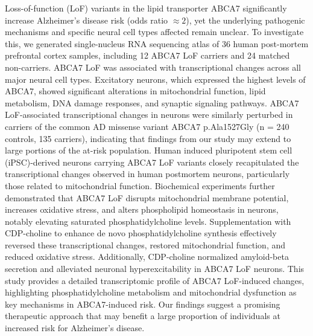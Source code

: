 Loss-of-function (LoF) variants in the lipid transporter ABCA7 significantly increase Alzheimer's disease risk (odds ratio $\approx  2$), yet the underlying pathogenic mechanisms and specific neural cell types affected remain unclear. To investigate this, we generated single-nucleus RNA sequencing atlas of 36 human post-mortem prefrontal cortex samples, including 12 ABCA7 LoF carriers and 24 matched non-carriers. ABCA7 LoF was associated with transcriptional changes across all major neural cell types. Excitatory neurons, which expressed the highest levels of ABCA7, showed significant alterations in mitochondrial function, lipid metabolism, DNA damage responses, and synaptic signaling pathways. ABCA7 LoF-associated transcriptional changes in neurons were similarly perturbed in carriers of the common AD missense variant ABCA7 p.Ala1527Gly (n = 240 controls, 135 carriers), indicating that findings from our study may extend to large portions of the at-risk population. Human induced pluripotent stem cell (iPSC)-derived neurons carrying ABCA7 LoF variants closely recapitulated the transcriptional changes observed in human postmortem neurons, particularly those related to mitochondrial function. Biochemical experiments further demonstrated that ABCA7 LoF disrupts mitochondrial membrane potential, increases oxidative stress, and alters phospholipid homeostasis in neurons, notably elevating saturated phosphatidylcholine levels. Supplementation with CDP-choline to enhance de novo phosphatidylcholine synthesis effectively reversed these transcriptional changes, restored mitochondrial function, and reduced oxidative stress. Additionally, CDP-choline normalized amyloid-beta secretion and alleviated neuronal hyperexcitability in ABCA7 LoF neurons. This study provides a detailed transcriptomic profile of ABCA7 LoF-induced changes, highlighting phosphatidylcholine metabolism and mitochondrial dysfunction as key mechanisms in ABCA7-induced risk. Our findings suggest a promising therapeutic approach that may benefit a large proportion of individuals at increased risk for Alzheimer's disease.

